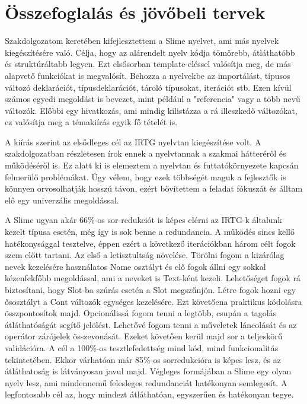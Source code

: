 \chapter{Összefoglalás és jövőbeli tervek}
\label{sec:conclusion}


Szakdolgozatom keretében kifejlesztettem a Slime nyelvet, ami más nyelvek kiegészítésére való.
Célja, hogy az alárendelt nyelv kódja tömörebb, átláthatóbb és struktúráltabb legyen.
Ezt elsősorban template-eléssel valósítja meg, de más alapvető funkciókat is megvalósít.
Behozza a nyelvekbe az importálást, típusos változó deklarációt, típusdeklarációt, tároló típusokat, iterációt stb.
Ezen kívül számos egyedi megoldást is bevezet, mint például a "referencia" vagy a több nevű változók.
Előbbi egy hivatkozás, ami mindig kilistázza a rá illeszkedő változókat, ez valósítja meg a témakiírás egyik fő tételét is.

A kiírás szerint az elsődleges cél az IRTG nyelvtan kiegészítése volt.
A szakdolgozatban részletesen írok ennek a nyelvtannak a szakmai hátteréről és működéséről is.
Ez alatt ki is elemeztem a nyelvtan és futtatókörnyezete kapcsán felmerülő problémákat.
Úgy vélem, hogy ezek többségét maguk a fejlesztők is könnyen orvosolhatják hosszú távon, 
ezért bővítettem a feladat fókuszát és álltam elő egy univerzális megoldással.

A Slime ugyan akár 66\%-os sor-redukciót is képes elérni az IRTG-k általunk kezelt típusa esetén, még így is sok benne a redundancia.
A működés sincs kellő hatékonysággal tesztelve, éppen ezért a következő iterációkban három célt fogok szem előtt tartani.
Az első a letisztultság növelése.
Törölni fogom a kizárólag nevek kezelésére használatos Name osztályt és elő fogok állni egy sokkal kézenfekfőbb megoldással, ami a neveket is Text-ként kezeli.
Lehetőséget fogok rá biztosítani, hogy Slot-ba szúrás esetén a Slot megszűnjön.
Létre fogok hozni egy ősosztályt a Cont változók egységes kezelésére.
Ezt követőena praktikus kódolásra összpontosítok majd.
Opcionálissá fogom tenni a legtöbb, csupán a tagolás átláthatóságát segítő jelölést.
Lehetővé fogom tenni a műveletek láncolását és az operátor zárójelek összevonását.
Ezeket követően kerül majd sor a teljeskörű validációra.
A cél a 100\%-os tesztlefedettség mind kód, mind funkcionalitás tekintetében.
Ekkor várhatóan már 85\%-os sorredukcióra is képes lesz, és az átláthatoság is látványosan javul majd. Végleges formájában a Slime egy olyan nyelv lesz, ami mindennemű felesleges redundanciát hatékonyan semlegesít. A legfontosabb cél az, hogy mindezt átláthatóan, egyszerűen és hatékonyan tegye.